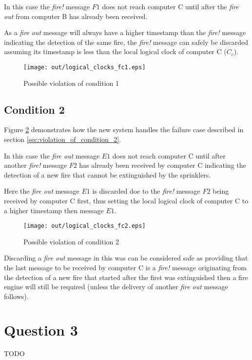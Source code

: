 \documentclass[twocolumn]{article}
\begin{document}
In this case the \textit{fire!} message $F1$ does not reach computer C until
after the \textit{fire out} from computer B has already been received.

As a \textit{fire out} message will always have a higher timestamp than the
\textit{fire!} message indicating the detection of the same fire, the
\textit{fire!} message can safely be discarded assuming its timestamp is less
than the local logical clock of computer C ($C_{c}$).

\begin{figure}[h!]
  \centering
  \texttt{[image: out/logical\_clocks\_fc1.eps]}
  \caption{Possible violation of condition 1}
  \label{fig:logical_clocks_fc1}
\end{figure}

\subsection{Condition 2}

Figure \ref{fig:logical_clocks_fc2} demonstrates how the new system handles the
failure case described in section \ref{sec:violation_of_condition_2}.

In this case the \textit{fire out} message $E1$ does not reach computer C until
after another \textit{fire!} message $F2$ has already been received by computer
C indicating the detection of a new fire that cannot be extinguished by the
sprinklers.

Here the \textit{fire out} message $E1$ is discarded doe to the \textit{fire!}
message $F2$ being received by computer C first, thus setting the local logical
clock of computer C to a higher timestamp then message $E1$.

\begin{figure}[h!]
  \centering
  \texttt{[image: out/logical\_clocks\_fc2.eps]}
  \caption{Possible violation of condition 2}
  \label{fig:logical_clocks_fc2}
\end{figure}

Discarding a \textit{fire out} message in this was can be considered safe as
providing that the last message to be received by computer C is a \textit{fire!}
message originating from the detection of a new fire that started after the
first was extinguished then a fire engine will still be required (unless the
delivery of another \textit{fire out} message follows).

\section{Question 3}

TODO
\end{document}
